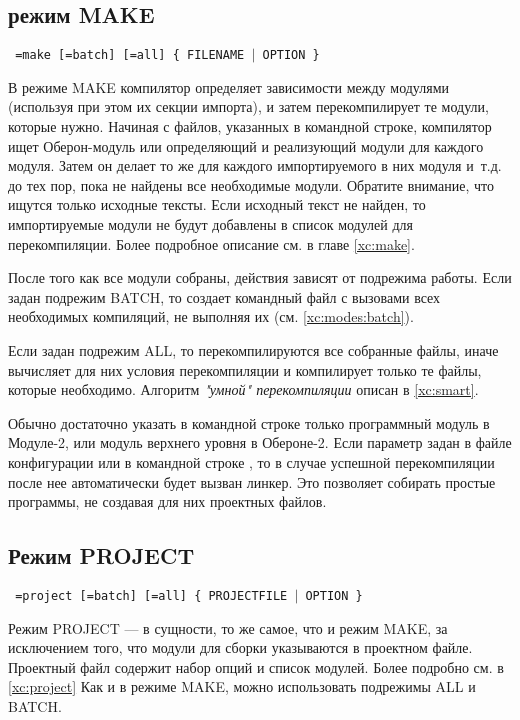 \subsection{режим MAKE}\label{xc:modes:make}

\begin{flushleft} \tt
    \xc{} =make [=batch] [=all] \{ FILENAME $|$ OPTION \}
\end{flushleft}
В режиме MAKE компилятор определяет зависимости между модулями
(используя при этом их секции импорта), 
и затем перекомпилирует те модули, которые нужно.
Начиная с файлов, указанных в командной строке, компилятор ищет
Оберон-модуль или определяющий и реализующий модули для каждого
модуля. Затем он делает то же для каждого импортируемого в них
модуля и~т.д. до тех пор, пока не найдены все необходимые модули.
Обратите внимание, что ищутся только исходные тексты. Если исходный
текст не найден, то импортируемые модули не будут добавлены в список
модулей для перекомпиляции. Более подробное описание см. в главе
\ref{xc:make}.

После того как все модули собраны, действия \xds{} 
зависят от подрежима работы.
Если задан подрежим BATCH, то  \xds{} создает командный файл с вызовами
всех необходимых компиляций, не выполняя их
(см. \ref{xc:modes:batch}).

Если задан подрежим ALL, то перекомпилируются все собранные файлы,
иначе \xds{} вычисляет для них условия перекомпиляции и компилирует
только те файлы, которые необходимо.
Алгоритм {\em "умной" перекомпиляции} описан в \ref{xc:smart}.

Обычно достаточно указать в командной строке только программный модуль
в Модуле-2, или модуль верхнего уровня в Обероне-2.
Если параметр  задан в файле конфигурации или в 
командной строке \xc{}, то в случае успешной перекомпиляции после нее
автоматически будет вызван линкер. Это позволяет собирать простые 
программы, не создавая для них проектных файлов.

\subsection{Режим PROJECT}\label{xc:modes:project}

\begin{flushleft} \tt
  \xc{} =project [=batch] [=all] \{ PROJECTFILE $|$ OPTION \}
\end{flushleft}
Режим PROJECT --- в сущности, то же самое, что и режим
MAKE, за исключением того, что модули для сборки указываются в
проектном файле. Проектный файл содержит набор опций и список 
модулей. Более подробно см. в \ref{xc:project}
Как и в режиме MAKE, можно использовать подрежимы ALL и BATCH.

